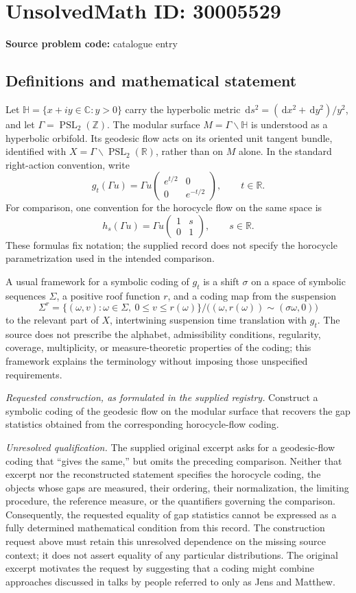 \documentclass[11pt]{article}
\newcommand{\Z}{\mathbb{Z}}
\newcommand{\R}{\mathbb{R}}
\newcommand{\C}{\mathbb{C}}
\newcommand{\dd}{\,\mathrm{d}}
\begin{document}
\section*{UnsolvedMath ID: 30005529}
\textbf{Source problem code:} catalogue entry
\subsection{Definitions and mathematical statement}
Let \(\mathbb H=\{x+iy\in\C:y>0\}\) carry the hyperbolic metric \(\dd s^2=(\dd x^2+\dd y^2)/y^2\), and let \(\Gamma=\operatorname{PSL}_2(\Z)\). The modular surface \(M=\Gamma\backslash\mathbb H\) is understood as a hyperbolic orbifold. Its geodesic flow acts on its oriented unit tangent bundle, identified with \(X=\Gamma\backslash\operatorname{PSL}_2(\R)\), rather than on \(M\) alone. In the standard right-action convention, write
\[
 g_t(\Gamma u)=\Gamma u\begin{pmatrix}e^{t/2}&0\\0&e^{-t/2}\end{pmatrix},\qquad t\in\R.
\]
For comparison, one convention for the horocycle flow on the same space is
\[
 h_s(\Gamma u)=\Gamma u\begin{pmatrix}1&s\\0&1\end{pmatrix},\qquad s\in\R.
\]
These formulas fix notation; the supplied record does not specify the horocycle parametrization used in the intended comparison.

A usual framework for a symbolic coding of \(g_t\) is a shift \(\sigma\) on a space of symbolic sequences \(\Sigma\), a positive roof function \(r\), and a coding map from the suspension
\[
 \Sigma^r=\{(\omega,v):\omega\in\Sigma,\ 0\leq v\leq r(\omega)\}/\bigl((\omega,r(\omega))\sim(\sigma\omega,0)\bigr)
\]
to the relevant part of \(X\), intertwining suspension time translation with \(g_t\). The source does not prescribe the alphabet, admissibility conditions, regularity, coverage, multiplicity, or measure-theoretic properties of the coding; this framework explains the terminology without imposing those unspecified requirements.

\emph{Requested construction, as formulated in the supplied registry.} Construct a symbolic coding of the geodesic flow on the modular surface that recovers the gap statistics obtained from the corresponding horocycle-flow coding.

\emph{Unresolved qualification.} The supplied original excerpt asks for a geodesic-flow coding that ``gives the same,'' but omits the preceding comparison. Neither that excerpt nor the reconstructed statement specifies the horocycle coding, the objects whose gaps are measured, their ordering, their normalization, the limiting procedure, the reference measure, or the quantifiers governing the comparison. Consequently, the requested equality of gap statistics cannot be expressed as a fully determined mathematical condition from this record. The construction request above must retain this unresolved dependence on the missing source context; it does not assert equality of any particular distributions. The original excerpt motivates the request by suggesting that a coding might combine approaches discussed in talks by people referred to only as Jens and Matthew.
\end{document}
